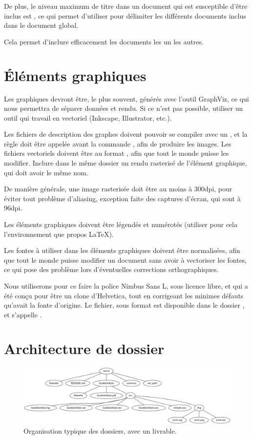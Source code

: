 De plus, le niveau maximum de titre dans un document qui est susceptible d'être
inclus est , ce qui permet d'utiliser  pour délimiter les
différents documents inclus dans le document global.

Cela permet d'inclure efficacement les documents les un les autres.


\section{Éléments graphiques}
Les graphiques devront être, le plus souvent, générés avec l'outil GraphViz, ce
qui nous permettra de séparer données et rendu. Si ce n'est pas possible,
utiliser un outil qui travail en vectoriel (Inkscape, Illustrator, etc.).

Les fichiers de description des graphes doivent pouvoir se compiler avec un
, et la règle doit être appelée avant la commande ,
afin de produire les images.
Les fichiers vectoriels doivent être au format , afin que tout le monde
puisse les modifier. Inclure dans le même dossier un rendu rasterisé de
l'élément graphique, qui doit avoir le même nom.

De manière générale, une image rasterisée doit être au moins à 300dpi, pour
éviter tout problème d'aliasing, exception faite des captures d'écran, qui sont
à 96dpi.

Les éléments graphiques doivent être légendés et numérotés (utiliser pour cela
l'environnement  que propos \LaTeX).

Les fontes à utiliser dans les éléments graphiques doivent être normalisées,
afin que tout le monde puisse modifier un document sans avoir à vectoriser les
fontes, ce qui pose des problème lors d'éventuelles corrections orthographiques.

Nous utiliserons pour ce faire la police Nimbus Sans L, sous licence libre, et
qui a été conçu pour être un clone d'Helvetica, tout en corrigeant les minimes
défauts qu'avait la fonte d'origine. Le fichier, sous format  est
disponible dans le dossier , et s'appelle .

\section{Architecture de dossier}
\begin{figure}[h!]
\includegraphics[width=\textwidth]{img/archi.png}
\caption{Organisation typique des dossiers, avec un livrable.}
\end{figure}

